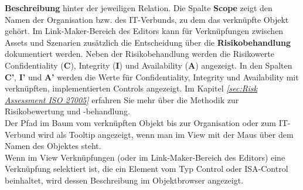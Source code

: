 \documentclass[a4paper,10pt]{book}
\begin{document}
\textbf{Beschreibung} hinter der jeweiligen Relation. Die Spalte \textbf{Scope} zeigt den Namen der Organisation bzw. des IT-Verbunds, zu dem das verknüpfte Objekt gehört.
Im Link-Maker-Bereich des Editors kann für Verknüpfungen zwischen Assets und Szenarien zusätzlich die Entscheidung über die \textbf{Risikobehandlung} dokumentiert werden.
Neben der Risikobehandlung werden die Risikowerte Confidentiality (\textbf{C}), Integrity (\textbf{I}) und Availability (\textbf{A}) angezeigt.
In den Spalten \textbf{C'}, \textbf{I'} und \textbf{A'} werden die Werte für Confidentiality, Integrity und Availability mit verknüpften, implementierten Controls angezeigt.
Im Kapitel {\em \ref{sec:Risk Assessment ISO 27005}  } erfahren Sie mehr über die Methodik zur Risikobewertung und -behandlung.
\newline\\
Der Pfad im Baum vom verknüpften Objekt bis zur Organisation oder zum IT-Verbund wird als Tooltip angezeigt, wenn man im View mit der Maus über dem Namen des Objektes steht.
\newline\\
Wenn im View Verknüpfungen (oder im Link-Maker-Bereich des Editors) eine Verknüpfung selektiert ist, die ein Element vom Typ Control oder ISA-Control beinhaltet, wird
dessen Beschreibung im Objektbrowser angezeigt.
\end{document}
